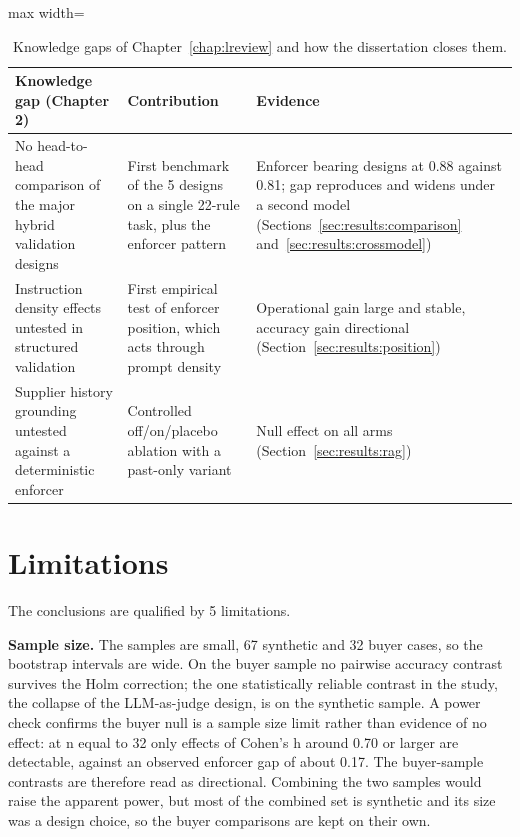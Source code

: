 \begin{table}[htb]
\centering
\caption{Knowledge gaps of Chapter~\ref{chap:lreview} and how the dissertation closes them.}
\label{tab:concl:gaps}
\footnotesize
\begin{adjustbox}{max width=\textwidth}
\begin{tabular}{@{}p{4.2cm}p{4.6cm}p{4.6cm}@{}}
\toprule
\textbf{Knowledge gap (Chapter 2)} & \textbf{Contribution} & \textbf{Evidence} \\
\midrule
No head-to-head comparison of the major hybrid validation designs & First benchmark of the 5 designs on a single 22-rule task, plus the enforcer pattern & Enforcer bearing designs at 0.88 against 0.81; gap reproduces and widens under a second model (Sections~\ref{sec:results:comparison} and~\ref{sec:results:crossmodel}) \\
Instruction density effects untested in structured validation & First empirical test of enforcer position, which acts through prompt density & Operational gain large and stable, accuracy gain directional (Section~\ref{sec:results:position}) \\
Supplier history grounding untested against a deterministic enforcer & Controlled off/on/placebo ablation with a past-only variant & Null effect on all arms (Section~\ref{sec:results:rag}) \\
\bottomrule
\end{tabular}
\end{adjustbox}
\end{table}

\section{Limitations}
\label{sec:concl:limitations}

The conclusions are qualified by 5 limitations.

\textbf{Sample size.} The samples are small, 67 synthetic and 32 buyer cases, so the bootstrap intervals are wide. On the buyer sample no pairwise accuracy contrast survives the Holm correction; the one statistically reliable contrast in the study, the collapse of the LLM-as-judge design, is on the synthetic sample. A power check confirms the buyer null is a sample size limit rather than evidence of no effect: at n equal to 32 only effects of Cohen's h around 0.70 or larger are detectable, against an observed enforcer gap of about 0.17. The buyer-sample contrasts are therefore read as directional. Combining the two samples would raise the apparent power, but most of the combined set is synthetic and its size was a design choice, so the buyer comparisons are kept on their own.


